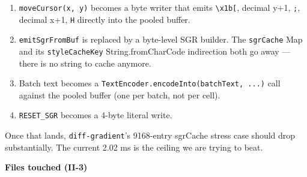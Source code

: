 \begin{enumerate}
\def\labelenumi{\arabic{enumi}.}
\tightlist
\item
  \texttt{m\allowbreak{}o\allowbreak{}v\allowbreak{}e\allowbreak{}C\allowbreak{}u\allowbreak{}r\allowbreak{}s\allowbreak{}o\allowbreak{}r\allowbreak{}(\allowbreak{}x\allowbreak{},\allowbreak{} \allowbreak{}y\allowbreak{})} becomes a byte writer that emits \texttt{\textbackslash{}\allowbreak{}x\allowbreak{}1\allowbreak{}b\allowbreak{}[}, decimal y+1, \texttt{;}, decimal x+1, \texttt{H} directly into the pooled buffer.
\item
  \texttt{e\allowbreak{}m\allowbreak{}i\allowbreak{}t\allowbreak{}S\allowbreak{}g\allowbreak{}r\allowbreak{}F\allowbreak{}r\allowbreak{}o\allowbreak{}m\allowbreak{}B\allowbreak{}u\allowbreak{}f} is replaced by a byte-level SGR builder. The \texttt{s\allowbreak{}g\allowbreak{}r\allowbreak{}C\allowbreak{}a\allowbreak{}c\allowbreak{}h\allowbreak{}e} Map and its \texttt{s\allowbreak{}t\allowbreak{}y\allowbreak{}l\allowbreak{}e\allowbreak{}C\allowbreak{}a\allowbreak{}c\allowbreak{}h\allowbreak{}e\allowbreak{}K\allowbreak{}e\allowbreak{}y} String.fromCharCode indirection both go away --- there is no string to cache anymore.
\item
  Batch text becomes a \texttt{T\allowbreak{}e\allowbreak{}x\allowbreak{}t\allowbreak{}E\allowbreak{}n\allowbreak{}c\allowbreak{}o\allowbreak{}d\allowbreak{}e\allowbreak{}r\allowbreak{}.\allowbreak{}e\allowbreak{}n\allowbreak{}c\allowbreak{}o\allowbreak{}d\allowbreak{}e\allowbreak{}I\allowbreak{}n\allowbreak{}t\allowbreak{}o\allowbreak{}(\allowbreak{}b\allowbreak{}a\allowbreak{}t\allowbreak{}c\allowbreak{}h\allowbreak{}T\allowbreak{}e\allowbreak{}x\allowbreak{}t\allowbreak{},\allowbreak{} \allowbreak{}.\allowbreak{}.\allowbreak{}.\allowbreak{})} call against the pooled buffer (one per batch, not per cell).
\item
  \texttt{R\allowbreak{}E\allowbreak{}S\allowbreak{}E\allowbreak{}T\allowbreak{}\_\allowbreak{}S\allowbreak{}G\allowbreak{}R} becomes a 4-byte literal write.
\end{enumerate}

Once that lands, \texttt{d\allowbreak{}i\allowbreak{}f\allowbreak{}f\allowbreak{}-\allowbreak{}g\allowbreak{}r\allowbreak{}a\allowbreak{}d\allowbreak{}i\allowbreak{}e\allowbreak{}n\allowbreak{}t}'s 9168-entry sgrCache stress case should drop substantially. The current 2.02 ms is the ceiling we are trying to beat.

\textbf{Files touched (II-3)}

